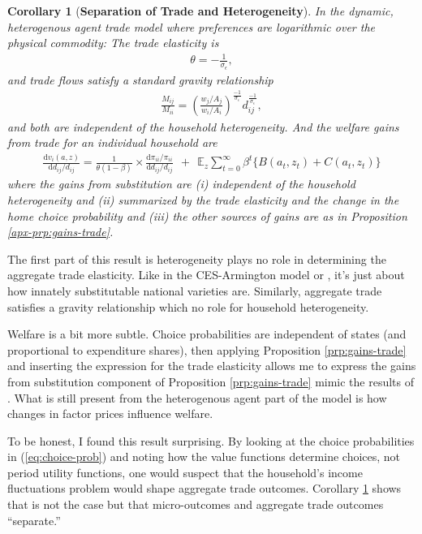 \documentclass[12pt,pdftex]{article}
\newtheorem{corr}{Corollary}
\begin{document}
\begin{onehalfspacing}
\begin{corr}[\textbf{Separation of Trade and Heterogeneity}]\label{prp:seperation} In the dynamic, heterogenous agent trade model where preferences are logarithmic over the physical commodity: The trade elasticity is
\begin{align}
\theta = -\frac{1}{\sigma_{\epsilon}}, \nonumber
\end{align}
and trade flows satisfy a standard gravity relationship
\begin{align}
\frac{M_{ij}}{M_{ii}} = \left( \frac{  w_{j} / A_{j} }{  w_{i} / A_{i} } \right)^{\frac{-1}{\sigma_{\epsilon}}} d_{ij}^{\frac{-1}{\sigma_{\epsilon}}}, \nonumber
\end{align}
and both are independent of the household heterogeneity. And the welfare gains from trade for an individual household are
\begin{align}
\nonumber
\frac{\mathrm{d} v_i(a, z)}{\mathrm{d} d_{ij} / d_{ij}} = \frac{1}{\theta (1-\beta)} \times \frac{\mathrm{d} \pi_{ii} / \pi_{ii}}{\mathrm{d}d_{ij} / d_{ij}} \ \ + \ \
\mathbb{E}_{z} \sum_{t = 0}^{\infty} \beta^{t} \bigg \{ B(a_{t},z_{t}) + C(a_{t},z_{t}) \bigg \}
\end{align}
where the gains from substitution are (i) independent of the household heterogeneity and (ii) summarized by the trade elasticity and the change in the home choice probability and (iii) the other sources of gains are as in Proposition \ref{apx-prp:gains-trade}.
\end{corr}
The first part of this result is heterogeneity plays no role in determining the aggregate trade elasticity. Like in the CES-Armington model or \citet{eaton2002technology}, it's just about how innately substitutable national varieties are. Similarly, aggregate trade satisfies a gravity relationship which no role for household heterogeneity.

Welfare is a bit more subtle. Choice probabilities are independent of states (and proportional to expenditure shares), then applying Proposition \ref{prp:gains-trade} and inserting the expression for the trade elasticity allows me to express the gains from substitution component of Proposition \ref{prp:gains-trade} mimic the results of \citet{arkolakis2012new}. What is still present from the heterogenous agent part of the model is how changes in factor prices influence welfare.

To be honest, I found this result surprising. By looking at the choice probabilities in (\ref{eq:choice-prob}) and noting how the value functions determine choices, not period utility functions, one would suspect that the household's income fluctuations problem would shape aggregate trade outcomes. Corollary \ref{prp:seperation} shows that is not the case but that micro-outcomes and aggregate trade outcomes ``separate.''


\end{onehalfspacing}
\end{document}
